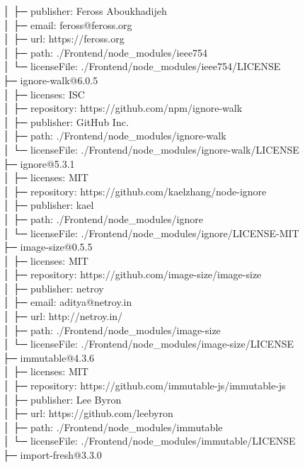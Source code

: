 │  ├─ publisher: Feross Aboukhadijeh\\
│  ├─ email: feross@feross.org\\
│  ├─ url: https://feross.org\\
│  ├─ path: ./Frontend/node\_modules/ieee754\\
│  └─ licenseFile: ./Frontend/node\_modules/ieee754/LICENSE\\
├─ ignore-walk@6.0.5\\
│  ├─ licenses: ISC\\
│  ├─ repository: https://github.com/npm/ignore-walk\\
│  ├─ publisher: GitHub Inc.\\
│  ├─ path: ./Frontend/node\_modules/ignore-walk\\
│  └─ licenseFile: ./Frontend/node\_modules/ignore-walk/LICENSE\\
├─ ignore@5.3.1\\
│  ├─ licenses: MIT\\
│  ├─ repository: https://github.com/kaelzhang/node-ignore\\
│  ├─ publisher: kael\\
│  ├─ path: ./Frontend/node\_modules/ignore\\
│  └─ licenseFile: ./Frontend/node\_modules/ignore/LICENSE-MIT\\
├─ image-size@0.5.5\\
│  ├─ licenses: MIT\\
│  ├─ repository: https://github.com/image-size/image-size\\
│  ├─ publisher: netroy\\
│  ├─ email: aditya@netroy.in\\
│  ├─ url: http://netroy.in/\\
│  ├─ path: ./Frontend/node\_modules/image-size\\
│  └─ licenseFile: ./Frontend/node\_modules/image-size/LICENSE\\
├─ immutable@4.3.6\\
│  ├─ licenses: MIT\\
│  ├─ repository: https://github.com/immutable-js/immutable-js\\
│  ├─ publisher: Lee Byron\\
│  ├─ url: https://github.com/leebyron\\
│  ├─ path: ./Frontend/node\_modules/immutable\\
│  └─ licenseFile: ./Frontend/node\_modules/immutable/LICENSE\\
├─ import-fresh@3.3.0\\
